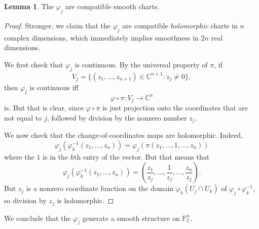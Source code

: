\documentclass[10pt]{article}
\newcommand{\CC}{\mathbb{C}}
\newcommand{\PP}{\mathbb P}
\theoremstyle{definition}
\newtheorem{lemma}{Lemma}[exer]
\begin{document}
\begin{lemma}
The $\varphi_j$ are compatible smooth charts.
\end{lemma}
\begin{proof}
Stronger, we claim that the $\varphi_j$ are compatible \emph{holomorphic} charts in $n$ complex dimensions, which immediately implies smoothness in $2n$ real dimensions.

We first check that $\varphi_j$ is continuous. By the universal property of $\pi$, if
$$V_j = \{(z_1, \dots, z_{n+1}) \in \CC^{n+1}: z_j \neq 0\},$$
then $\varphi_j$ is continuous iff
$$\varphi \circ \pi: V_j \to \CC^n$$
is. But that is clear, since $\varphi \circ \pi$ is just projection onto the coordinates that are not equal to $j$, followed by division by the nonzero number $z_j$.

We now check that the change-of-coordinates maps are holomorphic. Indeed,
$$\varphi_j(\varphi_k^{-1}(z_1, \dots, z_n)) = \varphi_j(\pi(z_1, \dots, 1, \dots, z_n))$$
where the $1$ is in the $k$th entry of the vector. But that means that
$$\varphi_j(\varphi_k^{-1}(z_1, \dots, z_n)) = \left(\frac{z_1}{z_j}, \dots, \frac{1}{z_j}, \dots, \frac{z_n}{z_j}\right).$$
But $z_j$ is a nonzero coordinate function on the domain $\varphi_k(U_j \cap U_k)$ of $\varphi_j \circ \varphi_k^{-1}$, so division by $z_j$ is holomorphic.
\end{proof}

We conclude that the $\varphi_j$ generate a smooth structure on $\PP_\CC^n$.
\end{document}
